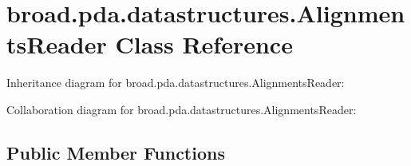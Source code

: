 \hypertarget{classbroad_1_1pda_1_1datastructures_1_1_alignments_reader}{\section{broad.\+pda.\+datastructures.\+Alignments\+Reader Class Reference}
\label{classbroad_1_1pda_1_1datastructures_1_1_alignments_reader}
}


Inheritance diagram for broad.\+pda.\+datastructures.\+Alignments\+Reader\+:


Collaboration diagram for broad.\+pda.\+datastructures.\+Alignments\+Reader\+:
\subsection*{Public Member Functions}
